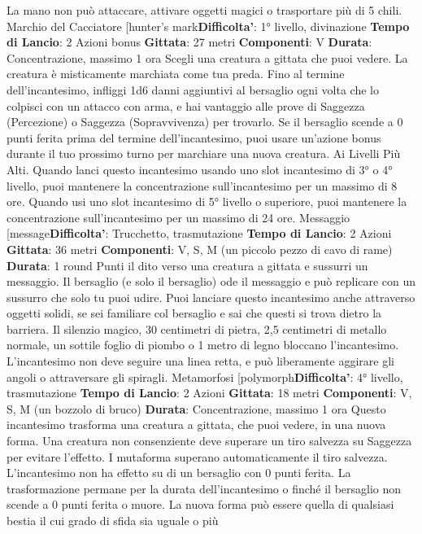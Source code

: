 \begin{multicols}{2}
La mano non può attaccare, attivare oggetti magici o
trasportare più di 5 chili.
Marchio del Cacciatore
[hunter’s mark\textbf{Difficolta'}:
1° livello, divinazione
\textbf{Tempo di Lancio}: 2 Azioni bonus
\textbf{Gittata}: 27 metri
\textbf{Componenti}: V
\textbf{Durata}: Concentrazione, massimo 1 ora
Scegli una creatura a gittata che puoi vedere. La
creatura è misticamente marchiata come tua preda.
Fino al termine dell’incantesimo, infliggi 1d6 danni
aggiuntivi al bersaglio ogni volta che lo colpisci con un
attacco con arma, e hai vantaggio alle prove di
Saggezza (Percezione) o Saggezza (Sopravvivenza)
per trovarlo. Se il bersaglio scende a 0 punti ferita prima
del termine dell’incantesimo, puoi usare un’azione
bonus durante il tuo prossimo turno per marchiare una
nuova creatura.
Ai Livelli Più Alti. Quando lanci questo incantesimo
usando uno slot incantesimo di 3° o 4° livello, puoi
mantenere la concentrazione sull’incantesimo per un
massimo di 8 ore. Quando usi uno slot incantesimo di
5° livello o superiore, puoi mantenere la concentrazione
sull’incantesimo per un massimo di 24 ore.
Messaggio
[message\textbf{Difficolta'}:
Trucchetto, trasmutazione
\textbf{Tempo di Lancio}: 2 Azioni
\textbf{Gittata}: 36 metri
\textbf{Componenti}: V, S, M (un piccolo pezzo di cavo di
rame)
\textbf{Durata}: 1 round
Punti il dito verso una creatura a gittata e sussurri un
messaggio. Il bersaglio (e solo il bersaglio) ode il
messaggio e può replicare con un sussurro che solo tu
puoi udire.
Puoi lanciare questo incantesimo anche attraverso
oggetti solidi, se sei familiare col bersaglio e sai che
questi si trova dietro la barriera. Il silenzio magico, 30
centimetri di pietra, 2,5 centimetri di metallo normale,
un sottile foglio di piombo o 1 metro di legno bloccano
l’incantesimo. L’incantesimo non deve seguire una linea
retta, e può liberamente aggirare gli angoli o
attraversare gli spiragli.
Metamorfosi
[polymorph\textbf{Difficolta'}:
4° livello, trasmutazione
\textbf{Tempo di Lancio}: 2 Azioni
\textbf{Gittata}: 18 metri
\textbf{Componenti}: V, S, M (un bozzolo di bruco)
\textbf{Durata}: Concentrazione, massimo 1 ora
Questo incantesimo trasforma una creatura a gittata,
che puoi vedere, in una nuova forma. Una creatura non
consenziente deve superare un tiro salvezza su
Saggezza per evitare l’effetto. I mutaforma superano
automaticamente il tiro salvezza. L’incantesimo non ha
effetto su di un bersaglio con 0 punti ferita.
La trasformazione permane per la durata
dell’incantesimo o finché il bersaglio non scende a 0
punti ferita o muore. La nuova forma può essere quella
di qualsiasi bestia il cui grado di sfida sia uguale o più

\end{multicols}

